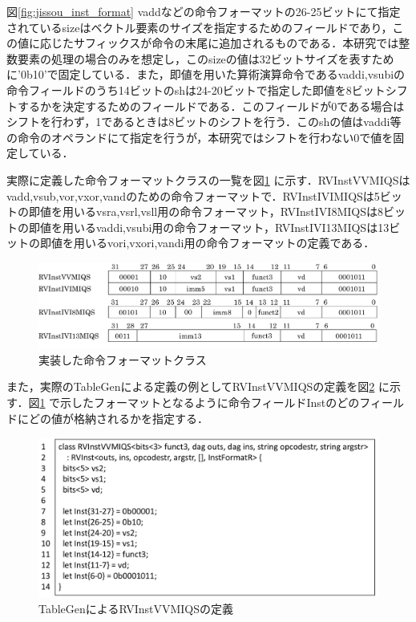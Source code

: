 図\ref{fig:jissou_inst_format}
vaddなどの命令フォーマットの26-25ビットにて指定されているsizeはベクトル要素のサイズを指定するためのフィールドであり，この値に応じたサフィックスが命令の末尾に追加されるものである．本研究では整数要素の処理の場合のみを想定し，このsizeの値は32ビットサイズを表すために'0b10'で固定している．また，即値を用いた算術演算命令であるvaddi,vsubiの命令フィールドのうち14ビットのshは24-20ビットで指定した即値を8ビットシフトするかを決定するためのフィールドである．このフィールドが0である場合はシフトを行わず，1であるときは8ビットのシフトを行う．このshの値はvaddi等の命令のオペランドにて指定を行うが，本研究ではシフトを行わない0で値を固定している．

実際に定義した命令フォーマットクラスの一覧を図\ref{fig:jissou_inst_format_class}
に示す．RVInstVVMIQSはvadd,vsub,vor,vxor,vandのための命令フォーマットで．RVInstIVIMIQSは5ビットの即値を用いるvsra,vsrl,vsll用の命令フォーマット，RVInstIVI8MIQSは8ビットの即値を用いるvaddi,vsubi用の命令フォーマット，RVInstIVI13MIQSは13ビットの即値を用いるvori,vxori,vandi用の命令フォーマットの定義である．

\begin{figure}[tb]
    \centering
    \includegraphics[scale=0.8]{image/jissou_inst_format_class.pdf}
    \caption{実装した命令フォーマットクラス}
    \label{fig:jissou_inst_format_class}
\end{figure}

また，実際のTableGenによる定義の例としてRVInstVVMIQSの定義を図\ref{fig:RVInstVVMIQS}
に示す．図\ref{fig:jissou_inst_format_class}
で示したフォーマットとなるように命令フィールドInstのどのフィールドにどの値が格納されるかを指定する．

\begin{figure}[tb]
    \centering
    \includegraphics[scale=0.6]{image/RVInstVVMIQS_v2.pdf}
    \caption{TableGenによるRVInstVVMIQSの定義}
    \label{fig:RVInstVVMIQS}
\end{figure}

